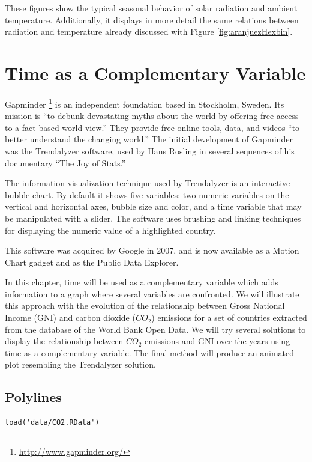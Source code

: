 \documentclass[smallroyalvopaper]{memoir}
\begin{document}
These figures show the typical seasonal behavior of solar radiation
and ambient temperature. Additionally, it displays in more detail the
same relations between radiation and temperature already discussed
with Figure \ref{fig:aranjuezHexbin}.

\chapter{Time as a Complementary Variable}
\label{sec:orgcad7741}
\label{cha:timeComplementary}

Gapminder \footnote{\url{http://www.gapminder.org/}} is an independent foundation based in Stockholm, Sweden.  Its mission is ``to debunk devastating myths about the world by offering free access to a fact-based world view.'' They provide free online tools, data, and videos ``to better understand the changing world.'' The initial development of Gapminder was the Trendalyzer software, used by Hans Rosling in several sequences of his documentary ``The Joy of Stats.''

The information visualization technique used by Trendalyzer is an interactive bubble chart. By default it shows five variables: two numeric variables on the vertical and horizontal axes, bubble size and color, and a time variable that may be manipulated with a slider. The software uses brushing and linking techniques for displaying the numeric value of a highlighted country.

This software was acquired by Google in 2007, and is now available as a Motion Chart gadget and as the Public Data Explorer.

In this chapter, time will be used as a complementary variable which adds information to a graph where several variables are confronted. We will illustrate this approach with the evolution of the relationship between Gross National Income (GNI) and carbon dioxide (\(CO_2\)) emissions for a set of countries extracted from the database of the World Bank Open Data. We will try several solutions to display the relationship between \(CO_2\) emissions and GNI over the years using time as a complementary variable. The final method will produce an animated plot resembling the Trendalyzer solution.

\section{Polylines}
\label{sec:org642cdb8}
\lstset{language=r,label= ,caption= ,captionpos=b,numbers=none}
\begin{lstlisting}
load('data/CO2.RData')
\end{lstlisting}
\end{document}
